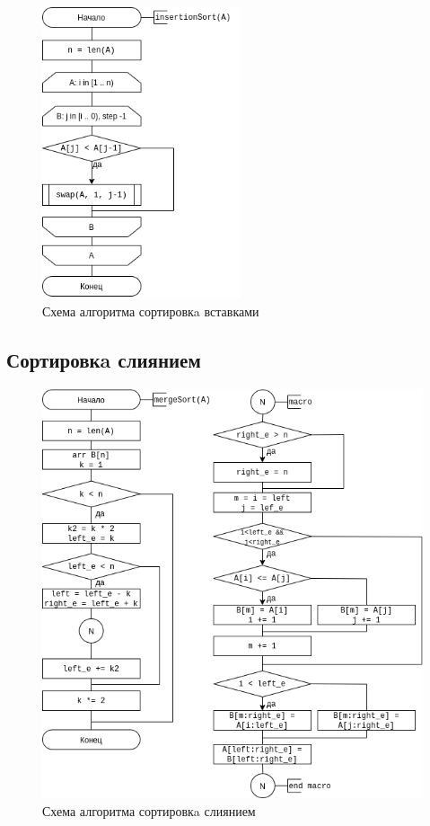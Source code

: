 \begin{figure}[h!]
    \centering
    \includegraphics[width=0.52\textwidth]{3/inc/d2.png}
    \caption{Схема алгоритма сортировкa вставками}
    \label{fig:2.2}
\end{figure}

\newpage
\subsection{Сортировкa слиянием}

\begin{figure}[h!]
    \centering
    \includegraphics[width=1\textwidth]{3/inc/d3.png}
    \caption{Схема алгоритма сортировкa слиянием}
    \label{fig:2.3}
\end{figure}


